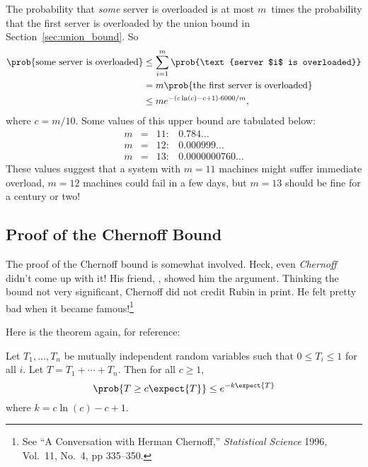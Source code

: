 The probability that \emph{some} server is overloaded is at most
$m$~times the probability that the first server is overloaded by the
union bound in Section~\ref{sec:union_bound}.  So
\begin{align*}
\prob{\text{some server is overloaded}}
    &\le \sum_{i = 1}^m \prob{\text{server $i$ is overloaded}} \\
    &= m \prob{\text{the first server is overloaded}} \\
    &\leq m e^{-(c \ln(c) - c + 1) \cdot 6000 / m},
\end{align*}
where $c = m/10$. Some values of this upper bound are tabulated below:
\[
\begin{array}{rcll}
m & = & 11: & 0.784\dots \\
m & = & 12: & 0.000999\dots \\
m & = & 13: & 0.0000000760\dots
\end{array}
\]
These values suggest that a system with $m = 11$ machines might suffer
immediate overload, $m = 12$ machines could fail in a few days, but $m
= 13$ should be fine for a century or two!

\subsection{Proof of the Chernoff Bound}\label{sec:chernoff_proof}

The proof of the Chernoff bound is somewhat involved.  Heck, even
\emph{Chernoff} didn't come up with it!  His friend, , showed him the argument.  Thinking the bound not very
significant, Chernoff did not credit Rubin in print.  He felt pretty
bad when it became famous!\footnote{See ``A Conversation with Herman
  Chernoff,'' \emph{Statistical Science} 1996, Vol.~11, No.~4, pp
  335--350.}

Here is the theorem again, for reference:

\begin{theorem}
Let $T_1, \dots, T_n$ be mutually independent random variables such
that $0 \leq T_i \leq 1$ for all $i$.  Let $T = T_1 + \cdots + T_n$.
Then for all $c \geq 1$,
\begin{equation}\label{chernoff-leq}
\prob{T \geq c \expect{T}} \leq e^{-k \expect{T}}
\end{equation}
where $k = c \ln(c) - c + 1$.
\end{theorem}

